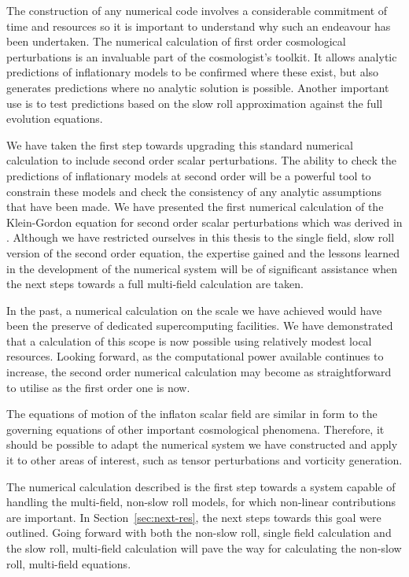 The construction of any numerical code involves a considerable commitment of time
and resources so it is important to understand why such an endeavour has been
undertaken. 
The numerical calculation of first order cosmological perturbations is an invaluable
part of the cosmologist's toolkit. It allows analytic predictions of inflationary
models to be confirmed where these exist, but also generates predictions where no
analytic solution is possible. Another important use is to test predictions based
on the slow roll approximation  against the full evolution equations. 

We have taken the first step towards upgrading this standard numerical calculation to
include second order scalar perturbations. 
% 
The ability to check the predictions of inflationary models at second order will
be a powerful tool to constrain these models and check the consistency of any
analytic assumptions that have been made. 
% 
We have presented the
first numerical calculation of the Klein-Gordon equation for second order scalar
perturbations which was derived in . Although we have restricted
ourselves in this thesis to the single field, slow roll version of the second order
equation,
the expertise gained and the lessons learned in the development of the numerical
system will be of significant assistance when the next steps towards a full
multi-field calculation are taken. 
% 


In the past, a numerical calculation on the scale we have achieved would have been
the preserve of dedicated supercomputing facilities. We have demonstrated that a
calculation of this scope is now possible using relatively modest local resources.
Looking forward, as the computational power available continues to increase, the
second order numerical calculation may become as straightforward to utilise as the
first order one is now. 

The equations of motion of the inflaton scalar field are similar in form to the
governing equations of other important cosmological phenomena. Therefore, it should
be possible to adapt the numerical system we have constructed and apply it to other
areas of interest, such as tensor perturbations and vorticity generation. 


The numerical calculation described is the first step towards a system capable of
handling the multi-field, non-slow roll models, for which non-linear contributions
are important. In Section~\ref{sec:next-res}, the next steps towards this goal were
outlined. 
% 
Going forward with both the non-slow roll, single field calculation and the slow
roll, multi-field calculation will pave the way for calculating the
non-slow roll, multi-field equations.
% 

